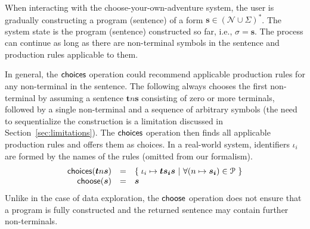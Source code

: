 \documentclass[anonymous, a4paper,UKenglish,cleveref, autoref, thm-restate]{lipics-v2021}
\newcommand{\ident}[1]{\textsf{#1}}
\newcommand{\select}{\textnormal{\ident{choose}}}
\newcommand{\choices}{\textnormal{\ident{choices}}}
\begin{document}
When interacting with the choose-your-own-adventure system, the user is gradually constructing a
program (sentence) of a form $\boldsymbol{s}\in(\mathcal{N}\cup\Sigma)^{*}$. The system state is the program (sentence)
constructed so far, i.e., $\sigma = \boldsymbol{s}$. The process can continue
as long as there are non-terminal symbols in the sentence and production rules applicable to them.

In general, the $\choices$ operation could recommend applicable production rules for any
non-terminal in the sentence. The following always chooses the first non-terminal by assuming
a sentence $\boldsymbol{t}n\boldsymbol{s}$ consisting of zero or more terminals, followed by a
single non-terminal and a sequence of arbitrary symbols (the need to sequentialize the construction
is a limitation discussed in Section~\ref{sec:limitations}). The $\choices$ operation then finds
all applicable production rules and offers them as choices. In a real-world system, identifiers
$\iota_i$ are formed by the names of the rules (omitted from our formalism).
\[
\begin{array}{rcl}
\choices(\boldsymbol{t}n\boldsymbol{s}) &=& \{\; \iota_i \mapsto \boldsymbol{t}\boldsymbol{s_i}\boldsymbol{s} ~|~ \forall (n\mapsto\boldsymbol{s_i})\in \mathcal{P} ~\}\\
\select(\boldsymbol{s}) &=& \boldsymbol{s}
\end{array}
\]
Unlike in the case of data exploration, the $\select$ operation does not ensure
that a program is fully constructed and the returned sentence may contain further non-terminals.
\end{document}

